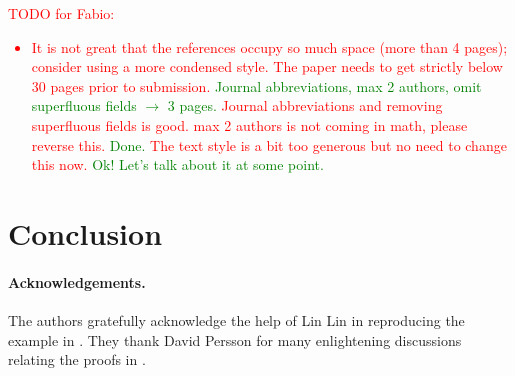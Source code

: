 \documentclass[12pt]{article}
\begin{document}
\textcolor{red}{TODO for Fabio:
\begin{itemize}
 \item It is not great that the references occupy so much space (more than 4 pages); consider using a more condensed style. The paper needs to get strictly below 30 pages prior to submission. \textcolor{green}{Journal abbreviations, max 2 authors, omit superfluous fields $\to$ 3 pages.}
 Journal abbreviations and removing superfluous fields is good. max 2 authors is not coming in math, please reverse this. \textcolor{green}{Done.} The text style is a bit too generous but no need to change this now. \textcolor{green}{Ok! Let's talk about it at some point.}
\end{itemize}
}
\color{blue}








\section{Conclusion}
\label{sec:conclusion}


\paragraph{Acknowledgements.} The authors gratefully acknowledge the help of Lin Lin in reproducing the example in . They thank David Persson for many enlightening discussions relating the proofs in .

\printbibliography


\end{document}
